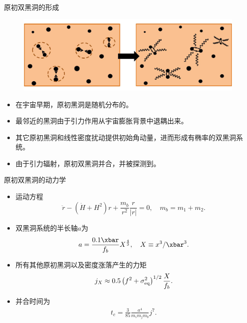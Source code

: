 \documentclass[xcolor={svgnames},compress]{beamer}
\let\olditem\item
\renewcommand{\item}{%
    \olditem\vspace{\fill}}
\def\({\left(}
\def\){\right)}
\def\({\left(}
\def\){\right)}
\def\e{\begin{equation}}
\def\q{\end{equation}}
\def\m{\begin{eqnarray}}
\def\n{\end{eqnarray}}
\begin{document}
\begin{frame}{原初双黑洞的形成}
    \vspace{-2mm}
    \begin{figure}[htbp!]
        \centering
        \includegraphics[width=\textwidth]{./pic/bbhs2.jpg}
    \end{figure}  \vspace{-2mm}
    \begin{itemize}
        \item 在宇宙早期，原初黑洞是随机分布的。
        \item 最邻近的黑洞由于引力作用从宇宙膨胀背景中退耦出来。
        \item 其它原初黑洞和线性密度扰动提供初始角动量，进而形成有椭率的双黑洞系统。
        \item 由于引力辐射，原初双黑洞并合，并被\lvc 探测到。
    \end{itemize}
\end{frame}
\begin{frame}{原初双黑洞的动力学}
    \begin{itemize}       
        \vspace{-2mm}
        \item 运动方程
        \e\label{eom1}
        \ddot{r} - \( \dot{H} + H^2 \) r + \frac{m_b}{r^2} \frac{r}{|r|} = 0, \quad m_b = m_1 + m_2. 
        \q
        
        \item 双黑洞系统的半长轴$a$为
        \e
        a ={0.1 \xbar \over f_b} X^{\frac{4}{3}}, \quad X\equiv {x^3/\xbar^3}. 
        \label{axis}
        \q 
        \item 所有其他原初黑洞以及密度涨落产生的力矩 
        \e
        j_X\approx 0.5 \(f^2+\sigma_{\rm{eq}}^2\)^{1/2} {X\over f_b}. 
        \label{jx}
        \q
        \item 并合时间为 
        \m 
        t_c = \frac{3}{85} \frac{a^4}{m_i m_j m_b} j^7.
        \n 
        
    \end{itemize}
\end{frame}
\end{document}
